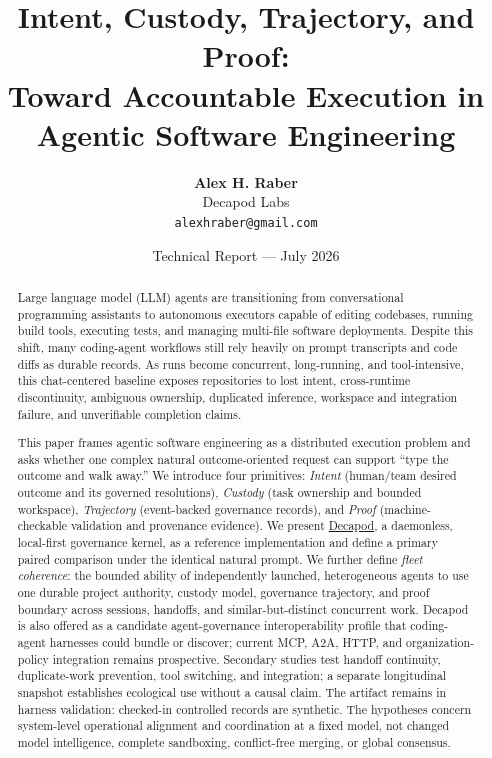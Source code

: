 \documentclass[11pt,a4paper]{article}
\title{\Huge\sffamily\bfseries Intent, Custody, Trajectory, and Proof:\\\Large Toward Accountable Execution in Agentic Software Engineering}
\author{\textbf{Alex H. Raber}\\[0.5em]
\sffamily Decapod Labs\\[0.2em]
\texttt{alexhraber@gmail.com}
}
\date{\sffamily Technical Report --- July 2026}
\begin{document}
\maketitle

\begin{abstract}
\noindent Large language model (LLM) agents are transitioning from conversational programming assistants to autonomous executors capable of editing codebases, running build tools, executing tests, and managing multi-file software deployments. Despite this shift, many coding-agent workflows still rely heavily on prompt transcripts and code diffs as durable records. As runs become concurrent, long-running, and tool-intensive, this chat-centered baseline exposes repositories to lost intent, cross-runtime discontinuity, ambiguous ownership, duplicated inference, workspace and integration failure, and unverifiable completion claims.

\medskip
\noindent This paper frames agentic software engineering as a distributed execution problem and asks whether one complex natural outcome-oriented request can support ``type the outcome and walk away.'' We introduce four primitives: \emph{Intent} (human/team desired outcome and its governed resolutions), \emph{Custody} (task ownership and bounded workspace), \emph{Trajectory} (event-backed governance records), and \emph{Proof} (machine-checkable validation and provenance evidence). We present \href{https://github.com/DecapodLabs/decapod}{Decapod}, a daemonless, local-first governance kernel, as a reference implementation and define a primary paired comparison under the identical natural prompt. We further define \emph{fleet coherence}: the bounded ability of independently launched, heterogeneous agents to use one durable project authority, custody model, governance trajectory, and proof boundary across sessions, handoffs, and similar-but-distinct concurrent work. Decapod is also offered as a candidate agent-governance interoperability profile that coding-agent harnesses could bundle or discover; current MCP, A2A, HTTP, and organization-policy integration remains prospective. Secondary studies test handoff continuity, duplicate-work prevention, tool switching, and integration; a separate longitudinal snapshot establishes ecological use without a causal claim. The artifact remains in harness validation: checked-in controlled records are synthetic. The hypotheses concern system-level operational alignment and coordination at a fixed model, not changed model intelligence, complete sandboxing, conflict-free merging, or global consensus.
\end{abstract}

\vspace{1.5em}















\end{document}
